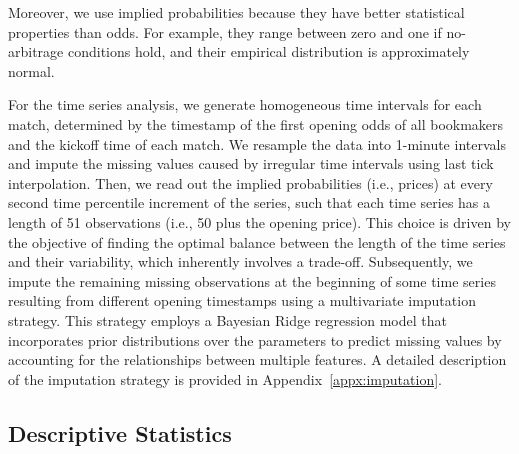 \documentclass[webpdf,modern,medium]{oup-authoring-template}
\theoremstyle{thmstyleone}%
\theoremstyle{thmstyletwo}%
\theoremstyle{thmstylethree}%
\begin{document}
        Moreover, we use implied probabilities because they have better statistical properties than odds. For example, they range between zero and one if no-arbitrage conditions hold, and their empirical distribution is approximately normal.

        For the time series analysis, we generate homogeneous time intervals for each match, determined by the timestamp of the first opening odds of all bookmakers and the kickoff time of each match.
        We resample the data into 1-minute intervals and impute the missing values caused by irregular time intervals using last tick interpolation. %
        Then, we read out the implied probabilities (i.e., prices) at every second time percentile increment of the series, such that each time series has a length of 51 observations (i.e., 50 plus the opening price). This choice is driven by the objective of finding the optimal balance between the length of the time series and their variability, which inherently involves a trade-off.
        Subsequently, we impute the remaining missing observations at the beginning of some time series resulting from different opening timestamps using a multivariate imputation strategy. This strategy employs a Bayesian Ridge regression model that incorporates prior distributions over the parameters to predict missing values by accounting for the relationships between multiple features. A detailed description of the imputation strategy is provided in Appendix~\ref{appx:imputation}.


    \subsection{Descriptive Statistics}
\end{document}

